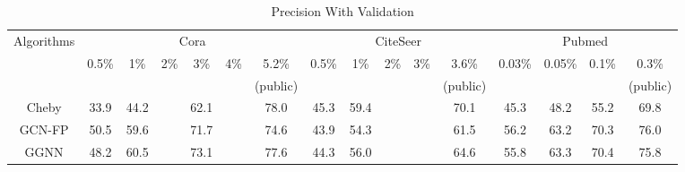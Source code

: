 \begin{table*}[htbp]
\setlength{\tabcolsep}{1.5pt}
  \centering
  \caption{Precision With Validation}
  \scriptsize
    \begin{tabular}{c|cccccc|ccccc|cccc}
    \multirow{3}[1]{*}{Algorithms} & \multicolumn{6}{c|}{Cora}                     & \multicolumn{5}{c|}{CiteSeer}         & \multicolumn{4}{c}{Pubmed} \\
          & \multirow{2}[1]{*}{0.5\%} & \multirow{2}[1]{*}{1\%} & \multirow{2}[1]{*}{2\%} & \multirow{2}[1]{*}{3\%} & \multirow{2}[1]{*}{4\%} & 5.2\% & \multirow{2}[1]{*}{0.5\%} & \multirow{2}[1]{*}{1\%} & \multirow{2}[1]{*}{2\%} & \multirow{2}[1]{*}{3\%} & 3.6\% & \multirow{2}[1]{*}{0.03\%} & \multirow{2}[1]{*}{0.05\%} & \multirow{2}[1]{*}{0.1\%} & 0.3\% \\
          &       &       &       &       &       & (public) &       &       &       &       & (public) &       &       &       & (public) \\
    \midrule
    Cheby & \cellcolor[rgb]{ .973,  .412,  .42}33.9 & \cellcolor[rgb]{ .973,  .412,  .42}44.2 &       & \cellcolor[rgb]{ .976,  .545,  .443}62.1 &       & \cellcolor[rgb]{ .988,  .729,  .478}78.0 & \cellcolor[rgb]{ .992,  .792,  .49}45.3 & \cellcolor[rgb]{ .996,  .886,  .51}59.4 &       &       & \cellcolor[rgb]{ .859,  .882,  .51}70.1 & \cellcolor[rgb]{ .973,  .412,  .42}45.3 & \cellcolor[rgb]{ .973,  .412,  .42}48.2 & \cellcolor[rgb]{ .973,  .412,  .42}55.2 & \cellcolor[rgb]{ .973,  .412,  .42}69.8 \\
    GCN-FP & \cellcolor[rgb]{ .992,  .82,  .498}50.5 & \cellcolor[rgb]{ .992,  .804,  .494}59.6 &       & \cellcolor[rgb]{ .992,  .792,  .49}71.7 &       & \cellcolor[rgb]{ .973,  .42,  .42}74.6 & \cellcolor[rgb]{ .988,  .745,  .482}43.9 & \cellcolor[rgb]{ .984,  .698,  .475}54.3 &       &       & \cellcolor[rgb]{ .973,  .412,  .42}61.5 & \cellcolor[rgb]{ .992,  .812,  .494}56.2 & \cellcolor[rgb]{ .996,  .859,  .502}63.2 & \cellcolor[rgb]{ .992,  .843,  .502}70.3 & \cellcolor[rgb]{ .992,  .796,  .494}76.0 \\
    GGNN  & \cellcolor[rgb]{ .988,  .765,  .486}48.2 & \cellcolor[rgb]{ .992,  .824,  .498}60.5 &       & \cellcolor[rgb]{ .992,  .831,  .498}73.1 &       & \cellcolor[rgb]{ .984,  .694,  .471}77.6 & \cellcolor[rgb]{ .988,  .757,  .486}44.3 & \cellcolor[rgb]{ .988,  .761,  .486}56.0 &       &       & \cellcolor[rgb]{ .98,  .62,  .459}64.6 & \cellcolor[rgb]{ .992,  .796,  .49}55.8 & \cellcolor[rgb]{ .996,  .859,  .506}63.3 & \cellcolor[rgb]{ .996,  .847,  .502}70.4 & \cellcolor[rgb]{ .992,  .784,  .49}75.8 \\

\end{tabular}
\end{table*}
